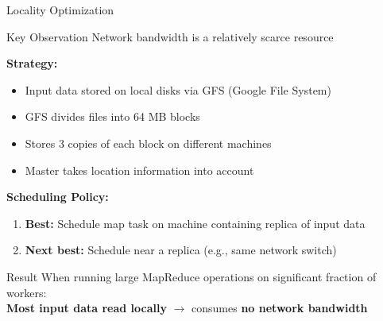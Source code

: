 \documentclass[aspectratio=169]{beamer}
\begin{document}
\begin{frame}{Locality Optimization}
\begin{block}{Key Observation}
Network bandwidth is a \alert{relatively scarce resource}
\end{block}

\vspace{0.3cm}

\textbf{Strategy:}
\begin{itemize}
    \item Input data stored on local disks via GFS (Google File System)
    \item GFS divides files into 64 MB blocks
    \item Stores 3 copies of each block on different machines
    \item Master takes location information into account
\end{itemize}

\vspace{0.3cm}

\textbf{Scheduling Policy:}
\begin{enumerate}
    \item \textbf{Best:} Schedule map task on machine containing replica of input data
    \item \textbf{Next best:} Schedule near a replica (e.g., same network switch)
\end{enumerate}

\vspace{0.3cm}

\begin{exampleblock}{Result}
When running large MapReduce operations on significant fraction of workers: \\
\textbf{Most input data read locally} $\rightarrow$ consumes \textbf{no network bandwidth}
\end{exampleblock}
\end{frame}
\end{document}
